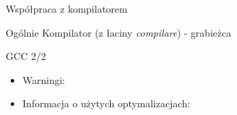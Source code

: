 \begin{frame}[fragile]{Współpraca z kompilatorem}
	\begin{block}{Ogólnie}
	 Kompilator (z łaciny \textit{compilare}) - grabieżca %
	\end{block}
	\begin{block}{GCC 2/2}
 		\begin{itemize}
			\item Warningi:
			\begin{itemize}
			 \item \verb*%-Wall%
			 \item \verb*%-Wextra%
			 \item \verb*%-Werror%
			 \item \verb*%-pedantic%
			 \item \verb*%-Wfloat-equal% //ciekawostka
			\end{itemize}
 			\item Informacja o użytych optymalizacjach:
 			 \begin{itemize}
				\item \verb*%-fstack-usage%
				\item \verb*%-ftree-vectorizer-verbose%
				\item \verb*%-fdump-tree-{vectorize,optimize}=stderr%
				\item \verb*%-fopt-info-{optimized,vec-missed}%
			 \end{itemize}
		\end{itemize}
	\end{block}
\end{frame}
